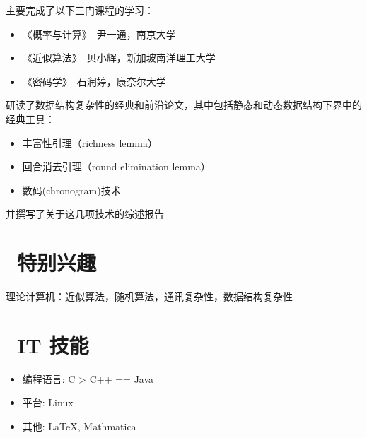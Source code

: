 \documentclass{resume}
\begin{document}
\begin{onehalfspacing}
%


主要完成了以下三门课程的学习：
\begin{itemize}
  \item 《概率与计算》　尹一通，南京大学
  \item 《近似算法》　贝小辉，新加坡南洋理工大学
  \item 《密码学》　石润婷，康奈尔大学
\end{itemize}

研读了数据结构复杂性的经典和前沿论文，其中包括静态和动态数据结构下界中的经典工具：
\begin{itemize}
  \item 丰富性引理（richness lemma）
  \item 回合消去引理（round elimination lemma）
  \item 数码(chronogram)技术
\end{itemize}
并撰写了关于这几项技术的综述报告

\end{onehalfspacing}


\section{\faHeart\ 特别兴趣}
理论计算机：近似算法，随机算法，通讯复杂性，数据结构复杂性

\section{\faCogs\ IT 技能}
\begin{itemize}[parsep=0.5ex]
  \item 编程语言: C > C++ == Java
  \item 平台: Linux
  \item 其他: \LaTeX, Mathmatica
\end{itemize}
\end{document}
